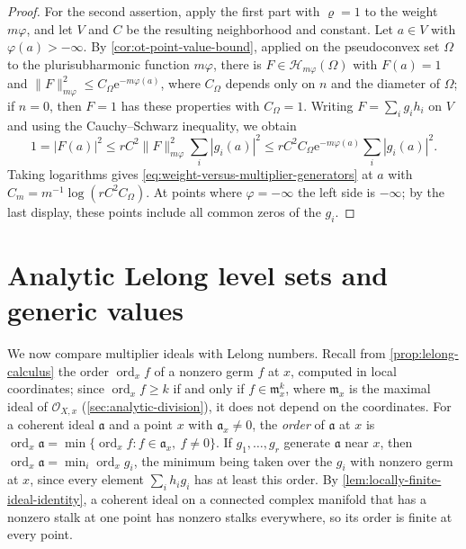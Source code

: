 \begin{proof}
For the second assertion, apply the first part with $\varrho=1$ to the weight $m\varphi$, and let $V$ and $C$ be the resulting neighborhood and constant. Let $a\in V$ with $\varphi(a)>-\infty$. By \cref{cor:ot-point-value-bound}, applied on the pseudoconvex set $\Omega$ to the plurisubharmonic function $m\varphi$, there is $F\in\mathcal H_{m\varphi}(\Omega)$ with $F(a)=1$ and $\|F\|_{m\varphi}^2\leq C_\Omega\mathrm e^{-m\varphi(a)}$, where $C_\Omega$ depends only on $n$ and the diameter of $\Omega$; if $n=0$, then $F=1$ has these properties with $C_\Omega=1$. Writing $F=\sum_ig_ih_i$ on $V$ and using the Cauchy--Schwarz inequality, we obtain
\[
 1=|F(a)|^2\leq rC^2\|F\|_{m\varphi}^2\sum_i|g_i(a)|^2
   \leq rC^2C_\Omega\mathrm e^{-m\varphi(a)}\sum_i|g_i(a)|^2.
\]
Taking logarithms gives \eqref{eq:weight-versus-multiplier-generators} at $a$ with $C_m=m^{-1}\log(rC^2C_\Omega)$. At points where $\varphi=-\infty$ the left side is $-\infty$; by the last display, these points include all common zeros of the $g_i$.
\end{proof}

\section{Analytic Lelong level sets and generic values}
\label{sec:siu-level-sets}

We now compare multiplier ideals with Lelong numbers. Recall from \cref{prop:lelong-calculus} the order $\operatorname{ord}_xf$ of a nonzero germ $f$ at $x$, computed in local coordinates; since $\operatorname{ord}_xf\geq k$ if and only if $f\in\mathfrak m_x^k$, where $\mathfrak m_x$ is the maximal ideal of $\mathcal O_{X,x}$ (\cref{sec:analytic-division}), it does not depend on the coordinates. For a coherent ideal $\mathfrak a$ and a point $x$ with $\mathfrak a_x\neq0$, the \emph{order} of $\mathfrak a$ at $x$ is $\operatorname{ord}_x\mathfrak a=\min\{\operatorname{ord}_xf:f\in\mathfrak a_x,\ f\neq0\}$. If $g_1,\ldots,g_r$ generate $\mathfrak a$ near $x$, then $\operatorname{ord}_x\mathfrak a=\min_i\operatorname{ord}_xg_i$, the minimum being taken over the $g_i$ with nonzero germ at $x$, since every element $\sum_ih_ig_i$ has at least this order. By \cref{lem:locally-finite-ideal-identity}, a coherent ideal on a connected complex manifold that has a nonzero stalk at one point has nonzero stalks everywhere, so its order is finite at every point.

